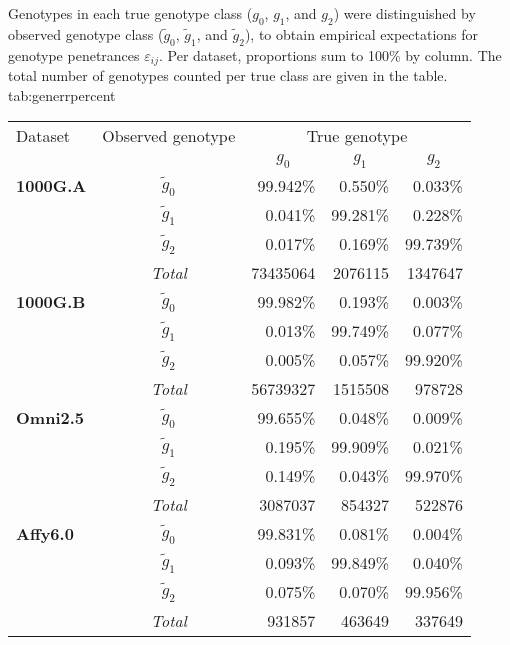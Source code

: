 

\begin{table}[!htb]
{Genotypes in each true genotype class ($g_0$, $g_1$, and $g_2$) were distinguished by observed genotype class ($\tilde{g}_0$, $\tilde{g}_1$, and $\tilde{g}_2$), to obtain empirical expectations for genotype penetrances $\varepsilon_{ij}$.
Per dataset, proportions sum to 100\% by column.
The total number of genotypes counted per true class are given in the table.\CorrectLabel}
{tab:generrpercent}
\centering
\begin{threeparttable}
\renewcommand{\arraystretch}{1.1}%
\begin{tabular}{lcrrr}
\toprule
 Dataset & Observed genotype & \multicolumn{3}{c}{True genotype} \\ \cmidrule(lr){3-5}
 & & \multicolumn{1}{c}{$g_0$} & \multicolumn{1}{c}{$g_1$} & \multicolumn{1}{c}{$g_2$} \\ \midrule
\textbf{1000G.A}
& $\tilde{g}_0$ & 99.942\% &  0.550\% &  0.033\% \\
& $\tilde{g}_1$ &  0.041\% & 99.281\% &  0.228\% \\
& $\tilde{g}_2$ &  0.017\% &  0.169\% & 99.739\% \\ \cmidrule(lr){2-5}
& \emph{Total} & \num{73435064} & \num{2076115} & \num{1347647} \\ \midrule
\textbf{1000G.B}
& $\tilde{g}_0$ & 99.982\% &  0.193\% &  0.003\% \\
& $\tilde{g}_1$ &  0.013\% & 99.749\% &  0.077\% \\
& $\tilde{g}_2$ &  0.005\% &  0.057\% & 99.920\% \\ \cmidrule(lr){2-5}
& \emph{Total} & \num{56739327} & \num{1515508} & \num{978728} \\ \midrule
\textbf{Omni2.5}
& $\tilde{g}_0$ & 99.655\% &  0.048\% &  0.009\% \\
& $\tilde{g}_1$ &  0.195\% & 99.909\% &  0.021\% \\
& $\tilde{g}_2$ &  0.149\% &  0.043\% & 99.970\% \\ \cmidrule(lr){2-5}
& \emph{Total} & \num{3087037} & \num{854327} & \num{522876} \\ \midrule
\textbf{Affy6.0}
& $\tilde{g}_0$ & 99.831\% &  0.081\% &  0.004\% \\
& $\tilde{g}_1$ &  0.093\% & 99.849\% &  0.040\% \\
& $\tilde{g}_2$ &  0.075\% &  0.070\% & 99.956\% \\ \cmidrule(lr){2-5}
& \emph{Total} &  \num{931857} & \num{463649} & \num{337649} \\ \bottomrule
\end{tabular}



\end{threeparttable}
\end{table}

